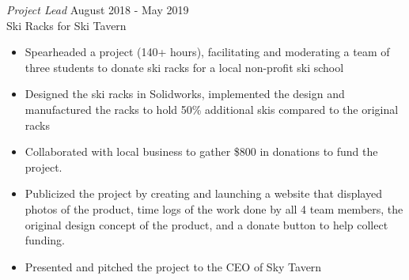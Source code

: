 \documentclass[margin, 10pt]{res}
\begin{document}
\begin{resume}
{\sl Project Lead} \hfill August 2018 - May 2019 \\
Ski Racks for Ski Tavern
\begin{itemize}
	\item Spearheaded a project (140+ hours), facilitating and moderating a team of three students to donate ski racks for a local non-profit ski school
	\item Designed the ski racks in Solidworks, implemented the design and manufactured the racks to hold 50\% additional skis compared to the original racks
	\item Collaborated with local business to gather \$800 in donations to fund the project.
	\item Publicized the project by creating and launching a website that displayed photos of the product, time logs of the work done by all 4 team members, the original design concept of the product, and a donate button to help collect funding. 
	\item Presented and pitched the project to the CEO of Sky Tavern
	
\end{itemize}



\end{resume}
\end{document}
